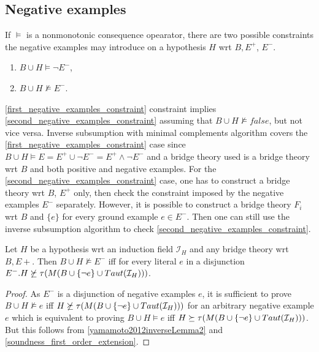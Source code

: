 \subsection{Negative examples}
If $\models$ is a nonmonotonic consequence opearator, there are two possible constraints the negative examples may introduce on a hypothesis $H$ wrt $B, E^+$, $E^-$.
\begin{enumerate}
\item\label{first_negative_examples_constraint} $B \cup H \models \neg E^-$,
\item\label{second_negative_examples_constraint} $B \cup H \not\models E^-$.
\end{enumerate}
\ref{first_negative_examples_constraint} constraint implies \ref{second_negative_examples_constraint} assuming that $B \cup H \not\models false$, but not vice versa. Inverse subsumption with minimal complements algorithm covers the \ref{first_negative_examples_constraint} case since $B \cup H \models E = E^+ \cup \neg E^- = E^+ \land \neg E^-$ and a bridge theory used is a bridge theory wrt $B$ and both positive and negative examples. For the \ref{second_negative_examples_constraint} case, one has to construct a bridge theory wrt $B$, $E^+$ only, then check the constraint imposed by the negative examples $E^-$ separately. However, it is possible to construct a bridge theory $F_i$ wrt $B$ and $\{e\}$ for every ground example $e \in E^-$. Then one can still use the inverse subsumption algorithm to check \ref{second_negative_examples_constraint}.

\begin{proposition}\label{proposition_negative_examples_subsumption}
Let $H$ be a hypothesis wrt an induction field $\mathcal{I}_H$ and any bridge theory wrt $B, E+$. Then $B \cup H \not\models E^-$ iff for every literal $e$ in a disjunction $E^-. H \not\succeq \tau(M(B \cup \{\neg e\} \cup Taut(\mathcal{I}_H)))$.
\end{proposition}
\begin{proof}
As $E^-$ is a disjunction of negative examples $e$, it is sufficient to prove
$B \cup H \not\models e$ iff
$H \not\succeq \tau(M(B \cup \{\neg e\} \cup Taut(\mathcal{I}_H)))$ for an arbitrary negative example $e$ which is equivalent to proving
$B \cup H \models e$ iff $H \succeq \tau(M(B \cup \{\neg e\} \cup Taut(\mathcal{I}_H)))$. But this follows from \ref{yamamoto2012inverseLemma2} and \ref{soundness_first_order_extension}.
\end{proof}

